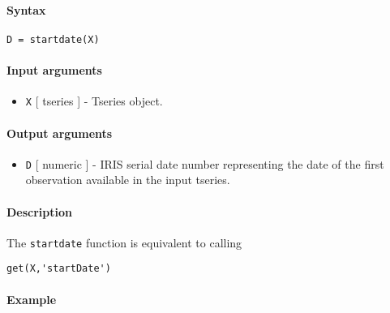 


	\paragraph{Syntax}\label{syntax}

\begin{verbatim}
D = startdate(X)
\end{verbatim}

\paragraph{Input arguments}\label{input-arguments}

\begin{itemize}
\itemsep1pt\parskip0pt
\item
  \texttt{X} {[} tseries {]} - Tseries object.
\end{itemize}

\paragraph{Output arguments}\label{output-arguments}

\begin{itemize}
\itemsep1pt\parskip0pt
\item
  \texttt{D} {[} numeric {]} - IRIS serial date number representing the
  date of the first observation available in the input tseries.
\end{itemize}

\paragraph{Description}\label{description}

The \texttt{startdate} function is equivalent to calling

\begin{verbatim}
get(X,'startDate')
\end{verbatim}

\paragraph{Example}\label{example}


